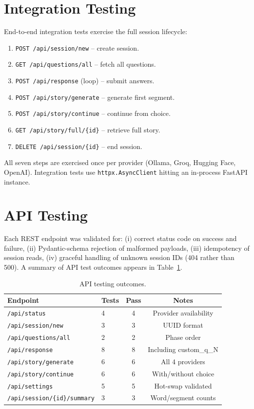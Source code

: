 \section{Integration Testing}
End-to-end integration tests exercise the full session lifecycle:
\begin{enumerate}
    \item \texttt{POST /api/session/new} -- create session.
    \item \texttt{GET  /api/questions/all} -- fetch all questions.
    \item \texttt{POST /api/response} (loop) -- submit answers.
    \item \texttt{POST /api/story/generate} -- generate first segment.
    \item \texttt{POST /api/story/continue} -- continue from choice.
    \item \texttt{GET  /api/story/full/\{id\}} -- retrieve full story.
    \item \texttt{DELETE /api/session/\{id\}} -- end session.
\end{enumerate}
All seven steps are exercised once per provider (Ollama, Groq,
Hugging Face, OpenAI). Integration tests use \texttt{httpx.AsyncClient}
hitting an in-process FastAPI instance.

\section{API Testing}
Each REST endpoint was validated for: (i) correct status code on
success and failure, (ii) Pydantic-schema rejection of malformed
payloads, (iii) idempotency of session reads, (iv) graceful
handling of unknown session IDs (404 rather than 500). A summary
of API test outcomes appears in Table~\ref{tab:apitests}.

\begin{table}[!t]
\caption{API testing outcomes.}
\label{tab:apitests}
\centering
\renewcommand{\arraystretch}{1.15}
\small
\begin{tabular}{@{}llcc@{}}
\toprule
\textbf{Endpoint} & \textbf{Tests} & \textbf{Pass} & \textbf{Notes} \\
\midrule
\texttt{/api/status}                  & 4  & 4  & Provider availability \\
\texttt{/api/session/new}             & 3  & 3  & UUID format \\
\texttt{/api/questions/all}           & 2  & 2  & Phase order \\
\texttt{/api/response}                & 8  & 8  & Including custom\_q\_N \\
\texttt{/api/story/generate}          & 6  & 6  & All 4 providers \\
\texttt{/api/story/continue}          & 6  & 6  & With/without choice \\
\texttt{/api/settings}                & 5  & 5  & Hot-swap validated \\
\texttt{/api/session/\{id\}/summary}  & 3  & 3  & Word/segment counts \\
\bottomrule
\end{tabular}
\end{table}

